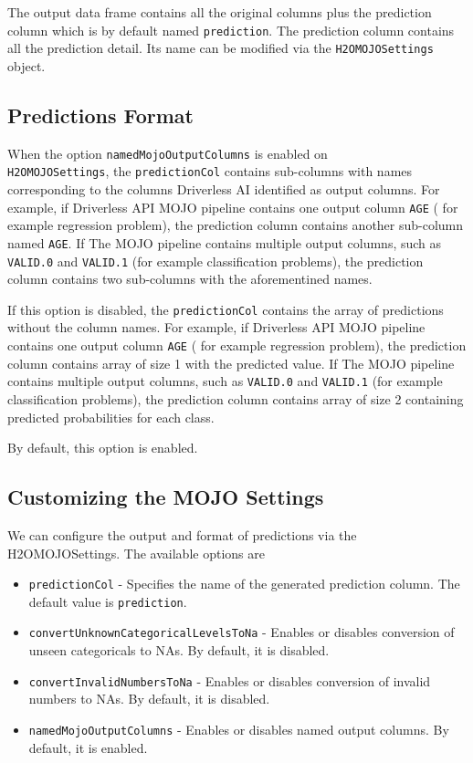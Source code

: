 The output data frame contains all the original columns plus the prediction column which is by default named
\texttt{prediction}. The prediction column contains all the prediction detail. Its name can be
modified via the \texttt{H2OMOJOSettings} object.

\subsection{Predictions Format}

When the option \texttt{namedMojoOutputColumns} is enabled on\\ \texttt{H2OMOJOSettings}, the \texttt{predictionCol} contains sub-columns with
names corresponding to the columns Driverless AI identified as output columns. For example, if Driverless API MOJO
pipeline contains one output column \texttt{AGE} ( for example regression problem), the prediction column contains another sub-column
named \texttt{AGE}. If The MOJO pipeline contains multiple output columns, such as \texttt{VALID.0} and \texttt{VALID.1} (for example classification problems),
the prediction column contains two sub-columns with the aforementined names.

If this option is disabled, the \texttt{predictionCol} contains the array of predictions without
the column names. For example, if Driverless API MOJO pipeline contains one output column \texttt{AGE} ( for example regression problem),
the prediction column contains array of size 1 with the predicted value.
If The MOJO pipeline contains multiple output columns, such as \texttt{VALID.0} and \texttt{VALID.1} (for example classification problems),
the prediction column contains array of size 2 containing predicted probabilities for each class.

By default, this option is enabled.

\subsection{Customizing the MOJO Settings}

We can configure the output and format of predictions via the H2OMOJOSettings. The available options are

\begin{itemize}
    \item \texttt{predictionCol} - Specifies the name of the generated prediction column. The default value is \texttt{prediction}.
    \item \texttt{convertUnknownCategoricalLevelsToNa} - Enables or disables conversion of unseen categoricals to NAs. By default, it is disabled.
    \item \texttt{convertInvalidNumbersToNa} - Enables or disables conversion of invalid numbers to NAs. By default, it is disabled.
    \item \texttt{namedMojoOutputColumns} - Enables or disables named output columns. By default, it is enabled.
\end{itemize}


